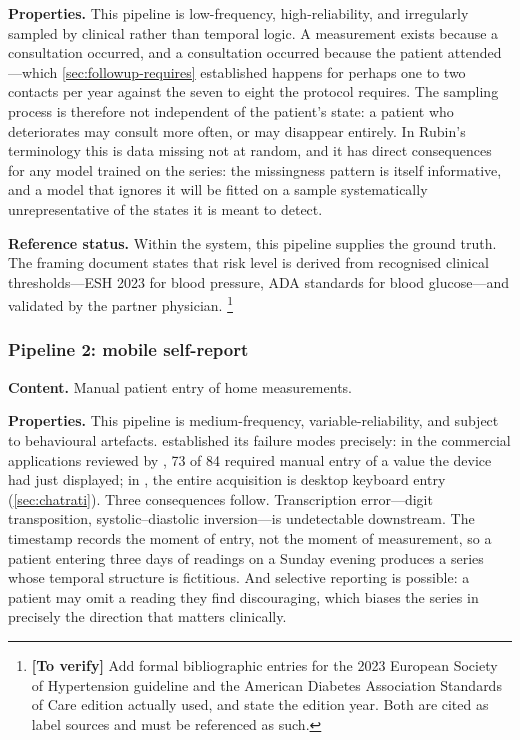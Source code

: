 \documentclass[12pt,a4paper,oneside]{report}
\newcommand{\verify}[1]{\footnote{\textbf{[To verify]} #1}}
\begin{document}
\textbf{Properties.} This pipeline is low-frequency, high-reliability, and irregularly sampled by clinical rather than temporal logic. A measurement exists because a consultation occurred, and a consultation occurred because the patient attended---which \cref{sec:followup-requires} established happens for perhaps one to two contacts per year against the seven to eight the protocol requires. The sampling process is therefore not independent of the patient's state: a patient who deteriorates may consult more often, or may disappear entirely. In Rubin's terminology this is data missing not at random, and it has direct consequences for any model trained on the series: the missingness pattern is itself informative, and a model that ignores it will be fitted on a sample systematically unrepresentative of the states it is meant to detect.

\textbf{Reference status.} Within the system, this pipeline supplies the ground truth. The framing document states that risk level is derived from recognised clinical thresholds---ESH 2023 for blood pressure, ADA standards for blood glucose---and validated by the partner physician.%
\verify{Add formal bibliographic entries for the 2023 European Society of Hypertension guideline and the American Diabetes Association Standards of Care edition actually used, and state the edition year. Both are cited as label sources and must be referenced as such.}

\subsubsection{Pipeline 2: mobile self-report}

\textbf{Content.} Manual patient entry of home measurements.

\textbf{Properties.} This pipeline is medium-frequency, variable-reliability, and subject to behavioural artefacts.  established its failure modes precisely: in the commercial applications reviewed by \textcite{alessa2019}, 73 of 84 required manual entry of a value the device had just displayed; in \textcite{chatrati2022}, the entire acquisition is desktop keyboard entry (\cref{sec:chatrati}). Three consequences follow. Transcription error---digit transposition, systolic--diastolic inversion---is undetectable downstream. The timestamp records the moment of entry, not the moment of measurement, so a patient entering three days of readings on a Sunday evening produces a series whose temporal structure is fictitious. And selective reporting is possible: a patient may omit a reading they find discouraging, which biases the series in precisely the direction that matters clinically.
\end{document}
